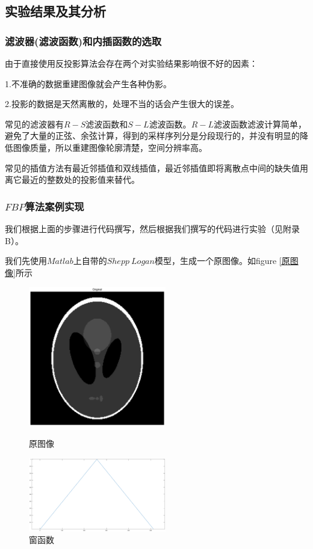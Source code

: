 \documentclass[hyperref]{ctexart}
\begin{document}
		\subsection{实验结果及其分析}
			\subsubsection{滤波器(滤波函数)和内插函数的选取}
				由于直接使用反投影算法会存在两个对实验结果影响很不好的因素：

					1.不准确的数据重建图像就会产生各种伪影。
					
					2.投影的数据是天然离散的，处理不当的话会产生很大的误差。
		
				常见的滤波器有$R-S$滤波函数和$S-L$滤波函数。$R-L$滤波函数滤波计算简单，避免了大量的正弦、余弦计算，得到的采样序列分是分段现行的，并没有明显的降低图像质量，所以重建图像轮廓清楚，空间分辨率高。

				常见的插值方法有最近邻插值和双线插值，最近邻插值即将离散点中间的缺失值用离它最近的整数处的投影值来替代。

			\subsubsection{$FBP$算法案例实现}
				我们根据上面的步骤进行代码撰写，然后根据我们撰写的代码进行实验（见附录B）。

				我们先使用$Matlab$上自带的$Shepp\ Logan$模型，生成一个原图像。如figure \ref{原图像}所示
			\begin{figure}
			  \begin{minipage}[ht!]{0.5\linewidth}
			    \centering
			    \includegraphics[width=60mm]{origin.eps}
					\caption{原图像 \label{原图像}}
			  \end{minipage}%
			  \begin{minipage}[ht!]{0.5\linewidth}
			    \centering
					\includegraphics[width=60mm]{fttplot.eps}
					\caption{窗函数 \label{窗函数}}
			  \end{minipage}
			\end{figure}
				
\end{document}
